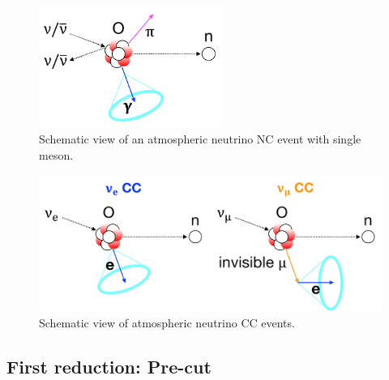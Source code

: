 \begin{figure}[h]
	\centering
	\includegraphics[width=6cm]{Figures/Selection/NC_single_meson}
	\caption[Schematic view of an atmospheric neutrino NC event with single meson]{
	Schematic view of an atmospheric neutrino NC event with single meson.
	}\label{Selection_NC_single_meson}
\end{figure}

\begin{figure}[h]
	\centering
	\includegraphics[width=12cm]{Figures/Selection/CC_nue_CC_numu}
	\caption[Schematic view of atmospheric neutrino CC events]{
	Schematic view of atmospheric neutrino CC events.
	}\label{Selection_CC_nue_CC_numu}
\end{figure}





\subsection{First reduction: Pre-cut}
